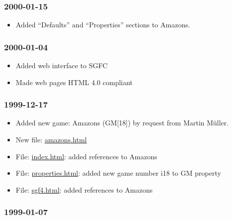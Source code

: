\subsubsection{2000-01-15}\label{section-9}

\begin{itemize}
\tightlist
\item
  Added ``Defaults'' and ``Properties'' sections to Amazons.
\end{itemize}

\subsubsection{2000-01-04}\label{section-10}

\begin{itemize}
\item
  Added web interface to SGFC
\item
  Made web pages HTML 4.0 compliant
\end{itemize}

\subsubsection{1999-12-17}\label{section-11}

\begin{itemize}
\item
  Added new game: Amazons (GM{[}18{]}) by request from Martin Müller.
\item
  New file: \href{https://red-bean.com/sgf/amazons.html}{amazons.html}
\item
  File: \href{https://red-bean.com/sgf/index.html}{index.html}: added
  references to Amazons
\item
  File:
  \href{https://red-bean.com/sgf/properties.html}{properties.html}:
  added new game number i18 to GM property
\item
  File: \href{https://red-bean.com/sgf/sgf4.html}{sgf4.html}: added
  references to Amazons
\end{itemize}

\subsubsection{1999-01-07}\label{section-12}

